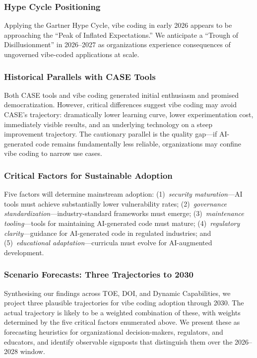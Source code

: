 \documentclass[preprint,12pt,authoryear]{elsarticle}
\begin{document}
\subsubsection{Hype Cycle Positioning}

Applying the Gartner Hype Cycle, vibe coding in early 2026 appears to be approaching the ``Peak of Inflated Expectations.'' We anticipate a ``Trough of Disillusionment'' in 2026--2027 as organizations experience consequences of ungoverned vibe-coded applications at scale.

\subsubsection{Historical Parallels with CASE Tools}

Both CASE tools and vibe coding generated initial enthusiasm and promised democratization. However, critical differences suggest vibe coding may avoid CASE's trajectory: dramatically lower learning curve, lower experimentation cost, immediately visible results, and an underlying technology on a steep improvement trajectory. The cautionary parallel is the quality gap---if AI-generated code remains fundamentally less reliable, organizations may confine vibe coding to narrow use cases.

\subsubsection{Critical Factors for Sustainable Adoption}

Five factors will determine mainstream adoption: (1)~\emph{security maturation}---AI tools must achieve substantially lower vulnerability rates; (2)~\emph{governance standardization}---industry-standard frameworks must emerge; (3)~\emph{maintenance tooling}---tools for maintaining AI-generated code must mature; (4)~\emph{regulatory clarity}---guidance for AI-generated code in regulated industries; and (5)~\emph{educational adaptation}---curricula must evolve for AI-augmented development.

\subsubsection{Scenario Forecasts: Three Trajectories to 2030}

Synthesising our findings across TOE, DOI, and Dynamic Capabilities, we project three plausible trajectories for vibe coding adoption through 2030. The actual trajectory is likely to be a weighted combination of these, with weights determined by the five critical factors enumerated above. We present these as forecasting heuristics for organizational decision-makers, regulators, and educators, and identify observable signposts that distinguish them over the 2026--2028 window.
\end{document}
